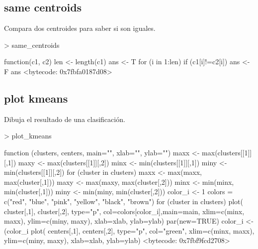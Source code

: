 \documentclass [a4paper] {article}
\begin{document}
\subsection{same centroids}
Compara dos centroides para saber si son iguales.
\begin{Schunk}
\begin{Sinput}
> same_centroids
\end{Sinput}
\begin{Soutput}
function(c1, c2){
  len <- length(c1)
  ans <- T
  for (i in 1:len){
    if (c1[i]!=c2[i]){
      ans <- F
    }
  }
  ans
}
<bytecode: 0x7fbfa0187d08>
\end{Soutput}
\end{Schunk}
\subsection{plot kmeans}
Dibuja el resultado de una clasificación.
\begin{Schunk}
\begin{Sinput}
> plot_kmeans
\end{Sinput}
\begin{Soutput}
function (clusters, centers, main="", xlab="", ylab="") {
  maxx <- max(clusters[[1]][,1])
  maxy <- max(clusters[[1]][,2])
  minx <- min(clusters[[1]][,1])
  miny <- min(clusters[[1]][,2])
  for (cluster in clusters){
    maxx <- max(maxx, max(cluster[,1]))
    maxy <- max(maxy, max(cluster[,2]))
    minx <- min(minx, min(cluster[,1]))
    miny <- min(miny, min(cluster[,2]))
  }
  color_i <- 1
  colors = c("red", "blue", "pink", "yellow", "black", "brown")
  for (cluster in clusters){
    plot( cluster[,1], cluster[,2], type="p", col=colors[color_i],main=main,
          xlim=c(minx, maxx), ylim=c(miny, maxy), xlab=xlab, ylab=ylab)
    par(new=TRUE)
    color_i <- (color_i%
  }
  plot( centers[,1], centers[,2], type="p", col="green",
        xlim=c(minx, maxx), ylim=c(miny, maxy), xlab=xlab, ylab=ylab)
}
<bytecode: 0x7fbf9fcd2708>
\end{Soutput}
\end{Schunk}
\end{document}
